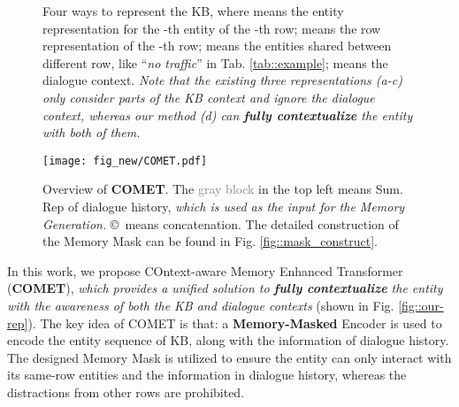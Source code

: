 \documentclass[11pt]{article}
\begin{document}
\begin{figure}[tb]
\begin{center}
\end{center}
\caption{Four ways to represent the KB, where  means the entity representation for the -th entity of the -th row;  means the row representation of the -th row;  means the entities shared between different row, like ``\textit{no traffic}'' in Tab. \ref{tab::example};  means the dialogue context. \textit{Note that the existing three representations (a-c) only consider parts of the KB context and ignore the dialogue context, whereas our method (d) can \textbf{fully contextualize} the entity with both of them.}
}     
\label{fig::diff-kb-rep-comp}     
\end{figure}




\begin{figure*}[htb]
\begin{center}
\texttt{[image: fig\_new/COMET.pdf]}
\caption{Overview of \textbf{COMET}. The \textcolor{gray}{gray block} in the top left means Sum. Rep of dialogue history, \textit{which is used as the input for the Memory Generation.} \copyright \ means concatenation. The detailed construction of the Memory Mask can be found in Fig. \ref{fig::mask_construct}.
}
\label{fig::model_archi}
\end{center}
\end{figure*}

In this work, we propose COntext-aware Memory Enhanced Transformer (\textbf{COMET}), \textit{which provides a unified solution to \textbf{fully contextualize} the entity with the awareness of both the KB and dialogue contexts} (shown in Fig. \ref{fig::our-rep}). 
The key idea of COMET is that: a \textbf{\textbf{Memory-Masked}} Encoder is used to encode the entity sequence of KB, along with the information of dialogue history. The designed Memory Mask is utilized to ensure the entity can only interact with its same-row entities and the information in dialogue history, whereas the distractions from other rows are prohibited.
\end{document}
